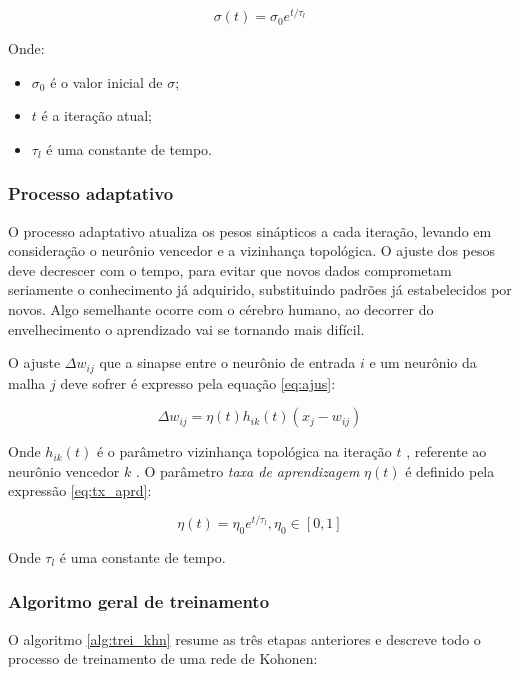 \begin{equation}\label{eq:leg_eft}
\sigma(t) = \sigma_0 e^{ t / \tau_l }
\end{equation}

Onde:

\begin{itemize}
\item $ \sigma_0 $ é o valor inicial de $ \sigma $;
\item $ t $ é a iteração atual;
\item $ \tau_l $ é uma constante de tempo.
\end{itemize}

\subsubsection{Processo adaptativo}

O processo adaptativo atualiza os pesos sinápticos a cada iteração, levando em
consideração o neurônio vencedor e a vizinhança topológica. O ajuste dos pesos
deve decrescer com o tempo, para evitar que novos dados comprometam seriamente
o conhecimento já adquirido, substituindo padrões já estabelecidos por novos.
Algo semelhante ocorre com o cérebro humano, ao decorrer do envelhecimento o
aprendizado vai se tornando mais difícil.

O ajuste $ \Delta w_{ij} $ que a sinapse entre o neurônio de entrada $ i $ e
um neurônio da malha $ j $ deve sofrer é expresso pela equação \ref{eq:ajus}:

\begin{equation}\label{eq:ajus}
\Delta w_{ij} = \eta(t) h_{ik}(t) (x_j - w_{ij})
\end{equation}

Onde $ h_{ik}(t) $ é o parâmetro vizinhança topológica na iteração $ t $ ,
referente ao neurônio vencedor $ k $ . O
parâmetro \textit{taxa de aprendizagem} $ \eta(t) $ é definido pela
expressão \ref{eq:tx_aprd}:

\begin{equation}\label{eq:tx_aprd}
  \eta(t) = \eta_0 e^{ t / \tau_l }, \eta_0 \in [0, 1]
\end{equation}

Onde $ \tau_l $ é uma constante de tempo.

\subsubsection{Algoritmo geral de treinamento}

O algoritmo \ref{alg:trei_khn} resume as três etapas anteriores e descreve
todo o processo de treinamento de uma rede de Kohonen:

